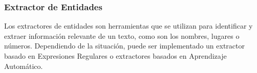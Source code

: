 \subsubsection{Extractor de Entidades}
Los extractores de entidades son herramientas que se utilizan para identificar y extraer información relevante de un texto, como son los nombres, lugares o números. Dependiendo de la situación, puede ser implementado un extractor basado en Expresiones
Regulares o extractores basados en Aprendizaje Automático.
\begin{table}[h]
\caption{Extractores de entidades. Elaboración propia}
\label{EntityExtractor}
\end{table}
